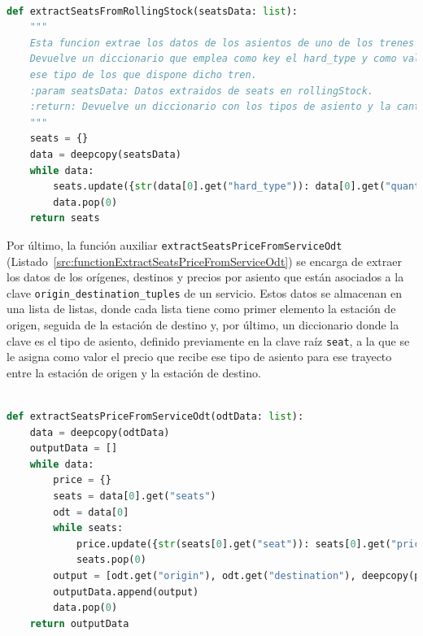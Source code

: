 \begin{lstlisting}[language=Python,
                   style=python,
                   frame=none,
                   numbers=none,
                   basicstyle=\ttfamily\normalsize,
                   caption={Función \texttt{extractSeatsFromRollingStock}},
                   label=src:functionExtractSeatsFromRollingStock,
                   inputencoding=utf8]                   

def extractSeatsFromRollingStock(seatsData: list):
    """
    Esta funcion extrae los datos de los asientos de uno de los trenes de rollingStock pasado como parametro.
    Devuelve un diccionario que emplea como key el hard_type y como value para esa key el numero de asientos de
    ese tipo de los que dispone dicho tren.
    :param seatsData: Datos extraidos de seats en rollingStock.
    :return: Devuelve un diccionario con los tipos de asiento y la cantidad de estos.
    """
    seats = {}
    data = deepcopy(seatsData)
    while data:
        seats.update({str(data[0].get("hard_type")): data[0].get("quantity")})
        data.pop(0)
    return seats
\end{lstlisting}

Por último, la función auxiliar \texttt{extractSeatsPriceFromServiceOdt} (Listado~\ref{src:functionExtractSeatsPriceFromServiceOdt}) se encarga de extraer los datos de los orígenes, destinos y precios por asiento que están asociados a la clave \texttt{origin\_destination\_tuples} de un servicio. Estos datos se almacenan en una lista de listas, donde cada lista tiene como primer elemento la estación de origen, seguida de la estación de destino y, por último, un diccionario donde la clave es el tipo de asiento, definido previamente en la clave raíz \texttt{seat}, a la que se le asigna como valor el precio que recibe ese tipo de asiento para ese trayecto entre la estación de origen y la estación de destino.

\begin{lstlisting}[language=Python,
                   style=python,
                   frame=none,
                   numbers=none,
                   basicstyle=\ttfamily\normalsize,
                   caption={Función \texttt{extractSeatsPriceFromServiceOdt}},
                   label=src:functionExtractSeatsPriceFromServiceOdt,
                   inputencoding=utf8]                   

def extractSeatsPriceFromServiceOdt(odtData: list):
    data = deepcopy(odtData)
    outputData = []
    while data:
        price = {}
        seats = data[0].get("seats")
        odt = data[0]
        while seats:
            price.update({str(seats[0].get("seat")): seats[0].get("price")})
            seats.pop(0)
        output = [odt.get("origin"), odt.get("destination"), deepcopy(price)]
        outputData.append(output)
        data.pop(0)
    return outputData
\end{lstlisting}

